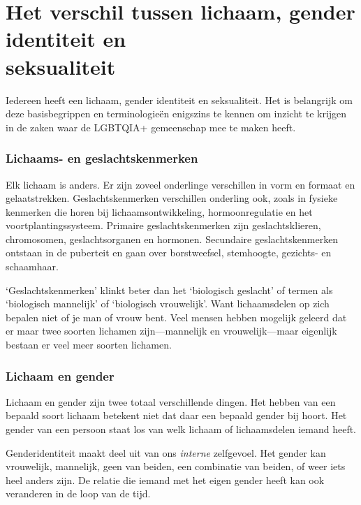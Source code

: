 \documentclass[12pt,openany]{book}
\begin{document}
\section*{Het verschil tussen lichaam, gender identiteit en \\ \mbox{seksualiteit}}

Iedereen heeft een lichaam, gender identiteit en seksualiteit. Het is belangrijk om deze basisbegrippen en terminologieën enigszins te kennen om inzicht te krijgen in de zaken waar de LGBTQIA+ gemeenschap mee te maken heeft.

\subsubsection*{Lichaams- en geslachtskenmerken}

Elk lichaam is anders. Er zijn zoveel onderlinge verschillen in vorm en formaat en gelaatstrekken. Geslachtskenmerken verschillen onderling ook, zoals in fysieke kenmerken die horen bij lichaamsontwikkeling, hormoonregulatie en het voortplantingssysteem. Primaire geslachtskenmerken zijn geslachtsklieren, chromosomen, geslachtsorganen en hormonen. Secundaire geslachtskenmerken ontstaan in de puberteit en gaan over borstweefsel, stemhoogte, gezichts- en schaamhaar.

`Geslachtskenmerken' klinkt beter dan het `biologisch geslacht' of termen als `biologisch mannelijk' of `biologisch vrouwelijk'. Want lichaamsdelen op zich bepalen niet of je man of vrouw bent. Veel mensen hebben mogelijk geleerd dat er maar twee soorten lichamen zijn—mannelijk en vrouwelijk—maar eigenlijk bestaan er veel meer soorten lichamen.

\subsubsection*{Lichaam en gender}

Lichaam en gender zijn twee totaal verschillende dingen. Het hebben van een bepaald soort lichaam betekent niet dat daar een bepaald gender bij hoort. Het gender van een persoon staat los van welk lichaam of lichaamsdelen iemand heeft.

Genderidentiteit maakt deel uit van ons \textit{interne} zelfgevoel. Het gender kan vrouwelijk, mannelijk, geen van beiden, een combinatie van beiden, of weer iets heel anders zijn. De relatie die iemand met het eigen gender heeft kan ook veranderen in de loop van de tijd.
\end{document}
